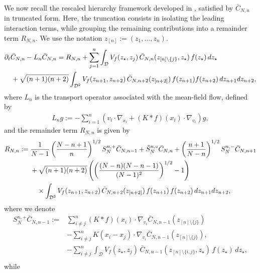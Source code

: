 \documentclass[pdflatex,sn-mathphys-num]{sn-jnl}
\theoremstyle{thmstyleone}%
\theoremstyle{thmstyletwo}%
\theoremstyle{thmstylethree}%
\begin{document}
\noindent

We now recall the rescaled hierarchy framework developed in \cite{bresch2024duality}, satisfied by $\bar{C}_{N,n}$ in truncated form. Here, the truncation consists in isolating the leading interaction terms, while grouping the remaining contributions into a remainder term $R_{N,n}$. We use the notation $z_{[n]} := (z_1,\dots,z_n)$.
\begin{align}\label{eq:hierarchy_equation}
&\partial_{t} \bar{C}_{N,n} - L_{n} \bar{C}_{N,n} = R_{N,n} 
+ \sum_{j=1}^{n} \int_{\mathcal{D}} V_{f}(z_{\star}, z_{j})\, \bar{C}_{N,n}(z_{[n] \setminus \{j\}}, z_{\star})\, f(z_{\star})\, dz_{\star} \notag \\
&\quad + \sqrt{(n+1)(n+2)} \int_{\mathcal{D}^2} V_{f}(z_{n+1}, z_{n+2})\, \bar{C}_{N,n+2}(z_{[n+2]})\, f(z_{n+1}) f(z_{n+2})\, dz_{n+1} dz_{n+2},
\end{align}
where \( L_n \) is the transport operator associated with the mean-field flow, defined by
\begin{align}\label{eq:operator_definition}
L_n g := -\sum_{i=1}^{n} \left( v_i \cdot \nabla_{x_i} + (K \ast f)(x_i) \cdot \nabla_{v_i} \right) g
,\end{align}
and the remainder term $R_{N,n}$ is given by
\begin{align}\label{remainder}
R_{N,n} :=\;& 
\frac{1}{N-1} \left( \frac{N - n + 1}{n} \right)^{1/2} S_{N}^{n,+} \bar{C}_{N,n-1} 
+ \tilde{S}_{N}^{n,\circ} \bar{C}_{N,n} + \left( \frac{n + 1}{N - n} \right)^{1/2} S_{N}^{n,-} \bar{C}_{N,n+1} \notag \\
&+ \sqrt{(n+1)(n+2)} 
\left( \left( \frac{(N - n)(N - n - 1)}{(N - 1)^2} \right)^{1/2} - 1 \right) \notag \\
&\quad \times \int_{\mathcal{D}^2} V_f(z_{n+1}, z_{n+2})\, \bar{C}_{N,n+2}(z_{[n+2]})\, f(z_{n+1})\, f(z_{n+2})\, dz_{n+1} dz_{n+2},
\end{align}
where we denote
\begin{align*}
S_N^{n,+} \bar{C}_{N,n-1}
:={}&
\sum_{i\ne j}^n (K\ast f)(x_i)\cdot\nabla_{v_i}\bar{C}_{N,n-1}(z_{[n]\setminus\{j\}})
\\
&-\sum_{i\ne j}^n
K(x_i-x_j)\cdot\nabla_{v_i}
\bar{C}_{N,n-1}(z_{[n]\setminus\{j\}}),
\\
&-\sum_{i\ne j}^n
\int_{\mathcal{D}} V_f(z_{\star},z_j)\,
\bar{C}_{N,n-1}(z_{[n]\setminus\{i,j\}},z_{\star})\,
f(z_{\star})\,dz_{\star},
\\
\end{align*}
while
\end{document}
